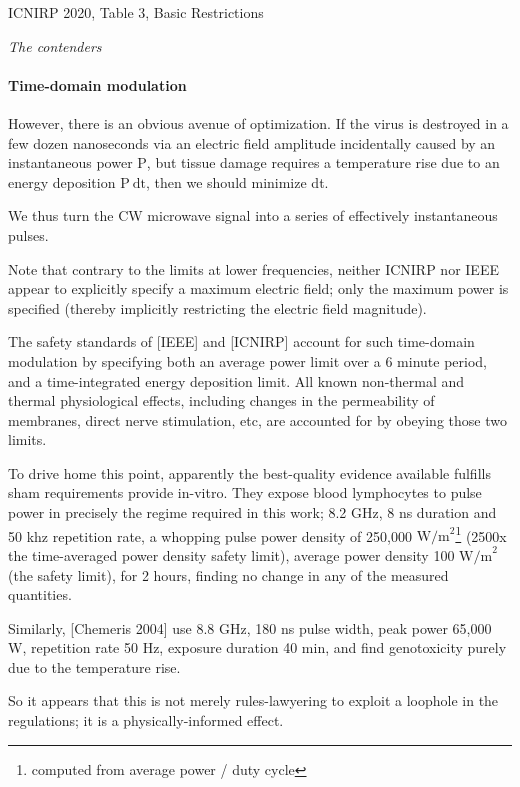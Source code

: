 \documentclass[fleqn,10pt]{article}
\begin{document}
ICNIRP 2020, Table 3, Basic Restrictions


\clearpage
{\Large \it The contenders}\\



\clearpage



\paragraph{Time-domain modulation}

However, there is an obvious avenue of optimization. If the virus is destroyed in a few dozen nanoseconds via an electric field amplitude incidentally caused by an instantaneous power $\text{P}$, but tissue damage requires a temperature rise due to an energy deposition $\text{P} \  \text{dt}$, then we should minimize dt.\

We thus turn the CW microwave signal into a series of effectively instantaneous pulses.

Note that contrary to the limits at lower frequencies, neither ICNIRP nor IEEE appear to explicitly specify a maximum electric field; only the maximum power is specified (thereby implicitly restricting the electric field magnitude).

The safety standards of [IEEE] and [ICNIRP] account for such time-domain modulation by specifying both an average power limit over a 6 minute period, and a time-integrated energy deposition limit. All known non-thermal and thermal physiological effects, including changes in the permeability of membranes, direct nerve stimulation, etc, are accounted for by obeying those two limits.

To drive home this point, apparently the best-quality evidence available fulfills sham requirements provide in-vitro. They expose blood lymphocytes to pulse power in precisely the regime required in this work; 8.2 GHz, 8 ns duration and 50 khz repetition rate, a whopping pulse power density of 250,000 $\text{W/m}^2$\footnote{computed from average power / duty cycle} (2500x the time-averaged power density safety limit), average power density 100 $\text{W/m}^2$ (the safety limit), for 2 hours, finding no change in any of the measured quantities. 

Similarly, [Chemeris 2004] use 8.8 GHz, 180 ns pulse width, peak power 65,000 W, repetition rate 50 Hz, exposure duration 40 min, and find genotoxicity purely due to the temperature rise.

So it appears that this is not merely rules-lawyering to exploit a loophole in the regulations; it is a physically-informed effect.
\end{document}

